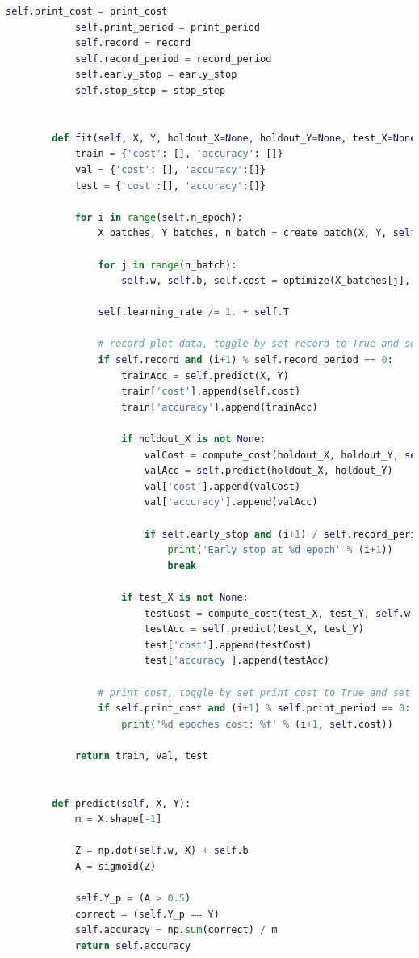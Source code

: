 \documentclass{article}
\begin{document}
\begin{lstlisting}[language=Python, breaklines]
	        self.print_cost = print_cost
	        self.print_period = print_period
	        self.record = record
	        self.record_period = record_period
	        self.early_stop = early_stop
	        self.stop_step = stop_step
	
	
	    def fit(self, X, Y, holdout_X=None, holdout_Y=None, test_X=None, test_Y=None):
	        train = {'cost': [], 'accuracy': []}
	        val = {'cost': [], 'accuracy':[]}
	        test = {'cost':[], 'accuracy':[]}
	
	        for i in range(self.n_epoch):
	            X_batches, Y_batches, n_batch = create_batch(X, Y, self.batch_size)
	
	            for j in range(n_batch):
	                self.w, self.b, self.cost = optimize(X_batches[j], Y_batches[j], self.w, self.b, self.learning_rate, self.lambd, self.regularized)
	
	            self.learning_rate /= 1. + self.T
	
	            # record plot data, toggle by set record to True and set record period
	            if self.record and (i+1) % self.record_period == 0:
	                trainAcc = self.predict(X, Y)
	                train['cost'].append(self.cost)
	                train['accuracy'].append(trainAcc)
	
	                if holdout_X is not None:
	                    valCost = compute_cost(holdout_X, holdout_Y, self.w, self.b, self.lambd, self.regularized)
	                    valAcc = self.predict(holdout_X, holdout_Y)
	                    val['cost'].append(valCost)
	                    val['accuracy'].append(valAcc)
	
	                    if self.early_stop and (i+1) / self.record_period > self.stop_step and strictly_increasing(val['cost'][-self.stop_step:]):
	                        print('Early stop at %d epoch' % (i+1))
	                        break
	
	                if test_X is not None:
	                    testCost = compute_cost(test_X, test_Y, self.w, self.b, self.lambd, self.regularized)
	                    testAcc = self.predict(test_X, test_Y)
	                    test['cost'].append(testCost)
	                    test['accuracy'].append(testAcc)
	
	            # print cost, toggle by set print_cost to True and set print period
	            if self.print_cost and (i+1) % self.print_period == 0:
	                print('%d epoches cost: %f' % (i+1, self.cost))
	
	        return train, val, test
	
	
	    def predict(self, X, Y):
	        m = X.shape[-1]
	
	        Z = np.dot(self.w, X) + self.b
	        A = sigmoid(Z)
	
	        self.Y_p = (A > 0.5)
	        correct = (self.Y_p == Y)
	        self.accuracy = np.sum(correct) / m
	        return self.accuracy
	

\end{lstlisting}
\newpage
\end{document}
